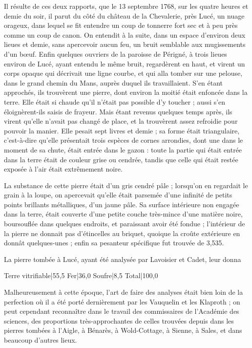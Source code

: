 \documentclass[a4paper, 12pt, oneside, french]{article}
\begin{document}
Il résulte de ces deux rapports, que le 13 septembre 1768, sur les quatre heures et demie du soir, il parut du côté du château de la Chevalerie, près Lucé, un nuage orageux, dans lequel se fit entendre un coup de tonnerre fort sec et à peu près comme un coup de canon. On entendit à la suite, dans un espace d'environ deux lieues et demie, sans apercevoir aucun feu, un bruit semblable aux mugissements d'un bœuf. Enfin quelques ouvriers de la paroisse de Périgné, à trois lieues environ de Lucé, ayant entendu le même bruit, regardèrent en haut, et virent un corps opaque qui décrivait une ligne courbe, et qui alla tomber sur une pelouse, dans le grand chemin du Mans, auprès duquel ils travaillaient. S'en étant approchés, ils trouvèrent une pierre, dont environ la moitié était enfoncée dans la terre. Elle était si chaude qu'il n'était pas possible d'y toucher ; aussi s'en éloignèrent-ils saisis de frayeur. Mais étant revenus quelques temps après, ils virent qu'elle n'avait pas changé de place, et la trouvèrent assez refroidie pour pouvoir la manier. Elle pesait sept livres et demie ; sa forme était triangulaire, c'est-à-dire qu'elle présentait trois espèces de cornes arrondies, dont une dans le moment de sa chute, était entrée dans le gazon : toute la partie qui était entrée dans la terre était de couleur grise ou cendrée, tandis que celle qui était restée exposée à l'air était extrêmement noire.

La substance de cette pierre était d'un gris cendré pâle ; lorsqu'on en regardait le grain à la loupe, on apercevait qu'elle était parsemée d'une infinité de petits points brillants métalliques, d'un jaune pâle. Sa surface intérieure non engagée dans la terre, était couverte d'une petite couche très-mince d'une matière noire, boursouflée dans quelques endroits, et paraissant avoir été fondue ; l'intérieur de la pierre ne donnait pas d'étincelles au briquet, quoique la croûte extérieure en donnât quelques-unes ; enfin sa pesanteur spécifique fut trouvée de 3,535.

La pierre tombée à Lucé, ayant été analysée par Lavoisier et Cadet, leur donna

Terre vitrifiable|55,5  
Fer|36,0  
Soufre|8,5  
Total|100,0

Malheureusement à cette époque, l'art de faire des analyses était bien loin de la perfection où il a été porté dernièrement par les Vauquelin et les Klaproth ; on peut cependant reconnaître dans le travail des commissaires de l'Académie des sciences, des proportions très-approchantes de celles trouvées depuis dans les pierres tombées à l'Aigle, à Bénarès, à Wold-Cottage, à Sienne, à Sales, et dans beaucoup d'autres lieux.
\end{document}
